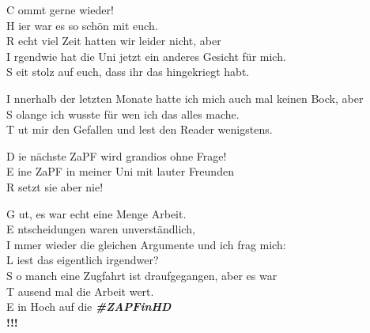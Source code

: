 
\begin{center}
  C ommt gerne wieder! \\
  H ier war es so schön mit euch. \\
  R echt viel Zeit hatten wir leider nicht, aber \\
  I rgendwie hat die Uni jetzt ein anderes Gesicht für mich. \\
  S eit stolz auf euch, dass ihr das hingekriegt habt.
\begin{center}

\end{center}
  I nnerhalb der letzten Monate hatte ich mich auch mal keinen Bock, aber \\
  S olange ich wusste für wen ich das alles mache. \\
  T ut mir den Gefallen und lest den Reader wenigstens.
\begin{center}

\end{center}
  D ie nächste ZaPF wird grandios ohne Frage! \\
  E ine ZaPF in meiner Uni mit lauter Freunden \\
  R setzt sie aber nie!
\begin{center}

\end{center}
  G ut, es war echt eine Menge Arbeit. \\
  E ntscheidungen waren unverständlich, \\
  I mmer wieder die gleichen Argumente und ich frag mich: \\
  L iest das eigentlich irgendwer? \\
  S o manch eine Zugfahrt ist draufgegangen, aber es war \\
  T ausend mal die Arbeit wert. \\
  E in Hoch auf die \textbf{\textit{\#ZAPFinHD}} \\

  \textbf{!!!}
\end{center}
